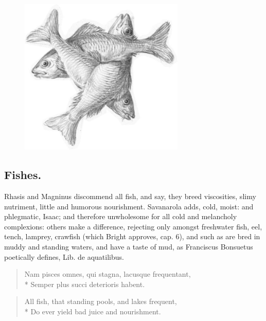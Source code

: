 {{\begin{figure}[H]
  \begingroup
  \centering
  \includegraphics[keepaspectratio,width=0.7\textwidth]{figures/Three-fishes-arranged-crosswise-small.jpg}
  \label{fig:threefishes}
\end{figure}

\subsection{Fishes.}
Rhasis and Magninus discommend all fish, and say, they
breed viscosities, slimy nutriment, little and humorous nourishment.
Savanarola adds, cold, moist: and phlegmatic, Isaac; and therefore
unwholesome for all cold and melancholy complexions: others make a
difference, rejecting only amongst freshwater fish, eel, tench,
lamprey, crawfish (which Bright approves, cap. 6), and such as are bred
in muddy and standing waters, and have a taste of mud, as Franciscus
Bonsuetus poetically defines, Lib. de aquatilibus.

\begin{latin}
\begin{verse}
Nam pisces omnes, qui stagna, lacusque frequentant,\\*
Semper plus succi deterioris habent.
\end{verse}
\end{latin}

\begin{verse}
All fish, that standing pools, and lakes frequent,\\*
Do ever yield bad juice and nourishment.
\end{verse}

}}
